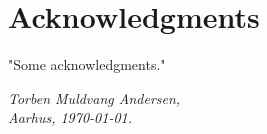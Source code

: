 \chapter{Acknowledgments}

"Some acknowledgments."

\vspace{2ex}
\begin{flushright}
  \emph{Torben Muldvang Andersen,}\\
  \emph{Aarhus, \today.}
\end{flushright}

\cleardoublepage{}

